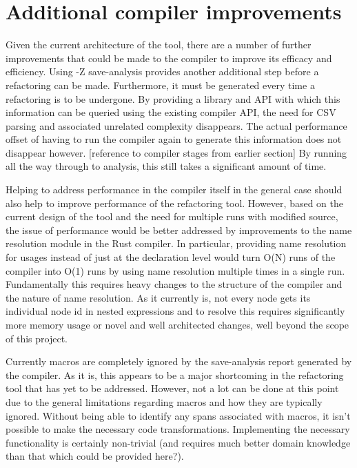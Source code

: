 
\section{Additional compiler improvements}
Given the current architecture of the tool, there are a number of further improvements that could be made to the compiler to improve its efficacy and efficiency. Using -Z save-analysis provides another additional step before a refactoring can be made. Furthermore, it must be generated every time a refactoring is to be undergone. By providing a library and API with which this information can be queried using the existing compiler API, the need for CSV parsing and associated unrelated complexity disappears. The actual performance offset of having to run the compiler again to generate this information does not disappear however. [reference to compiler stages from earlier section] By running all the way through to analysis, this still takes a significant amount of time. 

Helping to address performance in the compiler itself in the general case should also help to improve performance of the refactoring tool. However, based on the current design of the tool and the need for multiple runs with modified source, the issue of performance would be better addressed by improvements to the name resolution module in the Rust compiler. In particular, providing name resolution for usages instead of just at the declaration level would turn O(N) runs of the compiler into O(1) runs by using name resolution multiple times in a single run. Fundamentally this requires heavy changes to the structure of the compiler and the nature of name resolution. As it currently is, not every node gets its individual node id in nested expressions and to resolve this requires significantly more memory usage or novel and well architected changes, well beyond the scope of this project.


Currently macros are completely ignored by the save-analysis report generated by the compiler. As it is, this appears to be a major shortcoming in the refactoring tool that has yet to be addressed. However, not a lot can be done at this point due to the general limitations regarding macros and how they are typically ignored. Without being able to identify any spans associated with macros, it isn't possible to make the necessary code transformations. Implementing the necessary functionality is certainly non-trivial (and requires much better domain knowledge than that which could be provided here?).

